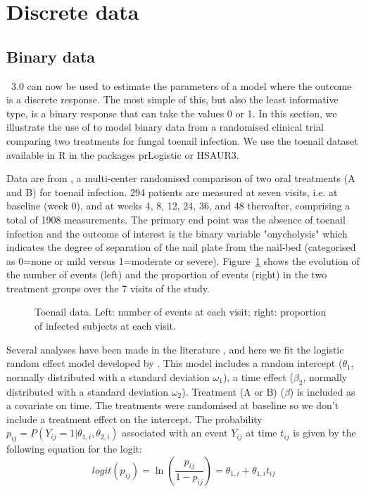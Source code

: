 
\section{Discrete data}

\subsection{Binary data} \label{sec:toenail}

\monolix~3.0 can now be used to estimate the parameters of a model where the outcome is a discrete response. The most simple of this, but also the least informative type, is a binary response that can take the values 0 or 1. In this section, we illustrate the use of \monolix to model binary data from a randomised clinical trial comparing two treatments for fungal toenail infection. We use the {\sf toenail} dataset available in {\sf R} in the packages {\sf prLogistic} or {\sf HSAUR3}.

Data are from \cite{debacker_toenail}, a multi-center randomised comparison  of two oral treatments (A and B) for toenail infection. 294 patients are measured at seven visits, i.e. at baseline (week 0), and at weeks 4, 8, 12, 24, 36, and 48 thereafter, comprising a total of 1908 measurements. The primary end point was the absence of toenail infection and the outcome of interest is the binary variable "onycholysis" which indicates the degree of separation of the nail plate from the nail-bed (categorised as 0=none or mild versus 1=moderate or severe). Figure~\ref{fig:toenailData} shows the evolution of the number of events (left) and the proportion of events (right) in the two treatment groups over the 7 visits of the study.

\begin{figure}[!h]
\begin{center}
\end{center}
\par \kern -0.5cm
\caption{Toenail data. Left: number of events at each visit; right: proportion of infected subjects at each visit.} \label{fig:toenailData}
\end{figure}

Several analyses have been made in the literature \cite{lesaffre2001effect,lin2011goodness}, and here we fit the logistic random effect model developed by \cite{hedeker1994random}. This model includes a random intercept ($\theta_1$, normally distributed with a standard deviation $\omega_1$),  a time effect ($\beta_2$, normally distributed with a standard deviation $\omega_2$). Treatment (A or B) ($\beta$) is included as a covariate on time. The treatments were randomised at baseline so we don't include a treatment effect on the intercept. The probability $p_{ij}=P(Y_{ij}=1 | \theta_{1,i}, \theta_{2,i})$ associated with an event $Y_{ij}$ at time $t_{ij}$ is given by the following equation for the logit:
\begin{equation}
logit(p_{ij}) = \ln \left( \frac{p_{ij}}{1-p_{ij}} \right) = \theta_{1,i} + \theta_{1,i} t_{ij}
\end{equation}

